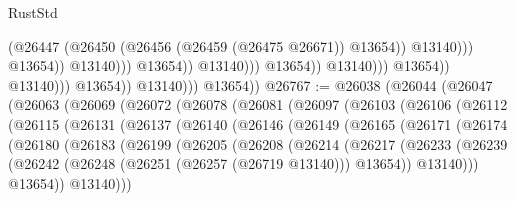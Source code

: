 \begin{lexlean}{RustStd}
\begin{coremodule}
                                                              (@26447
                                                                (@26450
                                                                  (@26456
                                                                    (@26459 (@26475 @26671))
                                                                    @13654))
                                                                @13140)))
                                                          @13654))
                                                      @13140)))
                                                @13654))
                                            @13140)))
                                      @13654))
                                  @13140)))
                            @13654))
                        @13140)))
                  @13654))
              @13140)))
        @13654))
@26767 := @26038
    (@26044
      (@26047
        (@26063
          (@26069
            (@26072
              (@26078
                (@26081
                  (@26097
                    (@26103
                      (@26106
                        (@26112
                          (@26115
                            (@26131
                              (@26137
                                (@26140
                                  (@26146
                                    (@26149
                                      (@26165
                                        (@26171
                                          (@26174
                                            (@26180
                                              (@26183
                                                (@26199
                                                  (@26205
                                                    (@26208
                                                      (@26214
                                                        (@26217
                                                          (@26233
                                                            (@26239
                                                              (@26242
                                                                (@26248
                                                                  (@26251 (@26257 (@26719 @13140)))
                                                                  @13654))
                                                              @13140)))
                                                        @13654))
                                                    @13140)))

\end{coremodule}
\end{lexlean}
